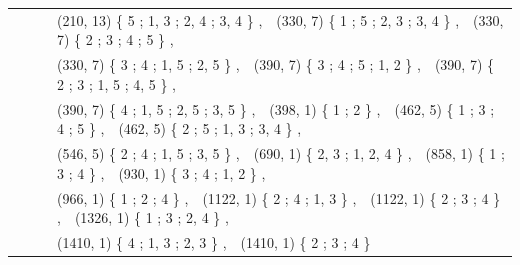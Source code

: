 \documentclass[11pt,reqno]{amsart}
\theoremstyle{definition}
\begin{document}
{\begin{longtable}{MMMM}
  & & & (210, 13) \{ 5 ; 1, 3 ; 2, 4 ; 3, 4 \} , \,\,  (330, 7) \{ 1 ; 5 ; 2, 3 ; 3, 4 \} , \,\,  (330, 7) \{ 2 ; 3 ; 4 ; 5 \} , \\
  & & &  (330, 7) \{ 3 ; 4 ; 1, 5 ; 2, 5 \} ,  \,\,  (390, 7) \{ 3 ; 4 ; 5 ; 1, 2 \} , \,\,  (390, 7) \{ 2 ; 3 ; 1, 5 ; 4, 5 \} ,  \\
  & & &  (390, 7) \{ 4 ; 1, 5 ; 2, 5 ; 3, 5 \} , \,\,  (398, 1) \{ 1 ; 2 \} , \,\, (462, 5) \{ 1 ; 3 ; 4 ; 5 \} , \,\,  (462, 5) \{ 2 ; 5 ; 1, 3 ; 3, 4 \} ,  \\
  & & &  (546, 5) \{ 2 ; 4 ; 1, 5 ; 3, 5 \} , \,\,  (690, 1) \{ 2, 3 ; 1, 2, 4 \} , \,\,  (858, 1) \{ 1 ; 3 ; 4 \} , \,\, (930, 1) \{ 3 ; 4 ; 1, 2 \} ,  \\
  & & &  (966, 1) \{ 1 ; 2 ; 4 \} , \,\,  (1122, 1) \{ 2 ; 4 ; 1, 3 \} , \,\,  (1122, 1) \{ 2 ; 3 ; 4 \} , \,\, (1326, 1) \{ 1 ; 3 ; 2, 4 \}  ,  \\
  & & &  (1410, 1) \{ 4 ; 1, 3 ; 2, 3 \} , \,\,  (1410, 1) \{ 2 ; 3 ; 4 \} \\
 \bottomrule
\end{longtable}


\vspace{1cm}



}
\end{document}

